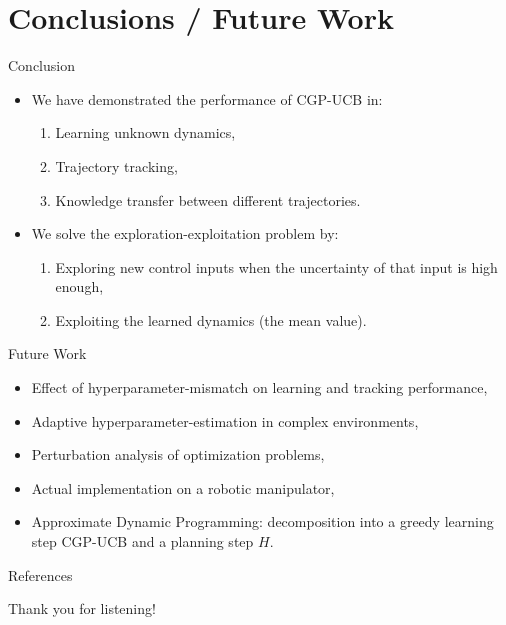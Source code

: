 \documentclass[handout]{beamer}
\begin{document}
\section{Conclusions / Future Work}
%
\begin{frame}{Conclusion}
\begin{itemize}
\item We have demonstrated the performance of CGP-UCB in: \pause
	\begin{enumerate}
	\item Learning unknown dynamics, \pause
	\item Trajectory tracking, \pause
	\item Knowledge transfer between different trajectories. \pause
	\end{enumerate}
\item We solve the exploration-exploitation problem by: \pause
	\begin{enumerate}
	\item Exploring new control inputs when the uncertainty of that input is high enough, \pause
	\item Exploiting the learned dynamics (the mean value).
	\end{enumerate}
\end{itemize}
\end{frame}
%
\begin{frame}{Future Work}
\begin{itemize}
\item Effect of hyperparameter-mismatch on learning and tracking performance, \pause
\item Adaptive hyperparameter-estimation in complex environments, \pause
\item Perturbation analysis of optimization problems, \pause
\item Actual implementation on a robotic manipulator, \pause
\item Approximate Dynamic Programming: decomposition into a greedy learning step CGP-UCB and a planning step $H$.
\end{itemize}
\end{frame}
%
\begin{frame}[allowframebreaks]{References}
\def\newblock{\hskip .11em plus .33em minus .07em}

\end{frame}
%
\begin{frame}
\centerline{Thank you for listening!}
\end{frame}
\appendix
%
\end{document}
